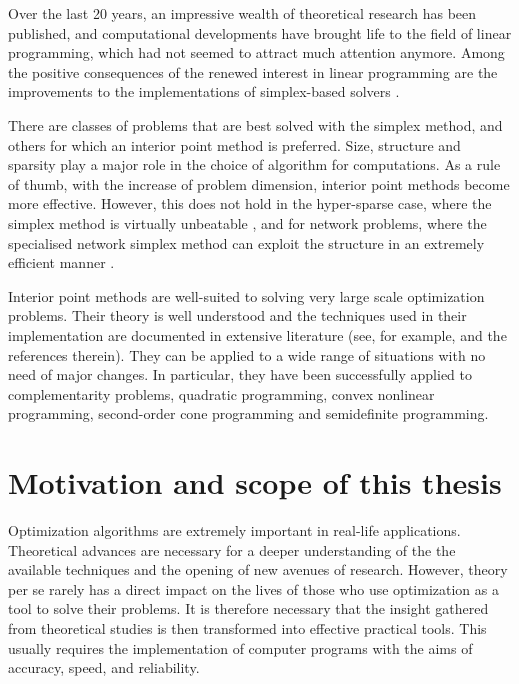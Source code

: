 Over the last 20 years, an impressive wealth of theoretical research
has been published, and computational developments have brought life
to the field of linear programming, which had not seemed to attract much
attention anymore.
Among the positive consequences of the renewed interest in linear
programming are the improvements to the implementations of 
simplex-based solvers \cite{Bixby94,Bixby02}.

There are classes of problems that are best solved with the simplex
method, and others for which an interior point method is preferred.
Size, structure and sparsity play a major role in the choice of
algorithm for computations.
As a rule of thumb, with the increase of problem dimension, 
interior point methods become more effective.
However, this does not hold in the hyper-sparse case, where the
simplex method is virtually unbeatable \cite{Bixby02,HallMcKinnon05}, 
and for network problems,
where the specialised network simplex method can exploit the
structure in an extremely efficient manner \cite{ip:NemhauserWolsey88}.

Interior point methods are well-suited to solving very
large scale optimization problems. Their theory is well understood
\cite{RoosTerlakyVial,ipm:Wright97,Ye97} 
and the techniques used in their implementation 
are documented in extensive literature (see, for example, 
\cite{AndersenGondzioMeszarosXu,GondzioTerlaky,LustigMarstenShanno94} 
and the references therein).
They can be applied to a wide range of situations with no need
of major changes. In particular, they have been successfully applied to
complementarity problems, quadratic programming,
convex nonlinear programming, second-order cone programming and
semidefinite programming.


%
%
\section{Motivation and scope of this thesis}

Optimization algorithms are extremely important in real-life 
applications. Theoretical advances are necessary for a deeper
understanding of the the available techniques and the opening of new avenues 
of research. 
However, theory per se rarely has a direct impact on the lives 
of those who use optimization as a tool to solve their problems.
It is therefore necessary that the insight gathered from
theoretical studies is then transformed into effective practical
tools. This usually requires the implementation of computer programs
with the aims of accuracy, speed, and reliability.

